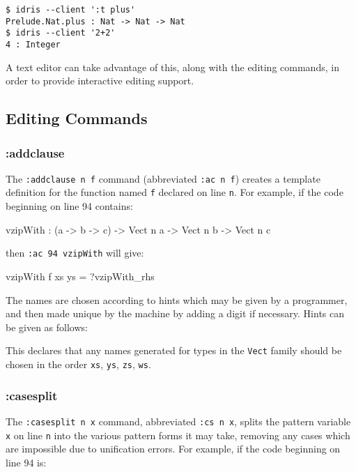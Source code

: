 \begin{lstlisting}[style=stdout]
$ idris --client ':t plus'
Prelude.Nat.plus : Nat -> Nat -> Nat
$ idris --client '2+2'
4 : Integer
\end{lstlisting}

\noindent
A text editor can take advantage of this, along with the editing commands, in order to provide interactive editing support.

\subsection{Editing Commands}

\subsubsection{:addclause}

The \texttt{:addclause n f} command (abbreviated \texttt{:ac n f}) creates a template definition for the function named \texttt{f} declared on line \texttt{n}.
For example, if the code beginning on line 94 contains:

\begin{code}
vzipWith : (a -> b -> c) -> 
           Vect n a -> Vect n b -> Vect n c
\end{code}

\noindent
then \texttt{:ac 94 vzipWith} will give:

\begin{code}
vzipWith f xs ys = ?vzipWith_rhs
\end{code}

\noindent
The names are chosen according to hints which may be given by a programmer, and then made unique by the machine by adding a digit if necessary.
Hints can be given as follows:

\begin{code}
\end{code}

\noindent
This declares that any names generated for types in the \texttt{Vect} family should be chosen in the order \texttt{xs}, \texttt{ys}, \texttt{zs}, \texttt{ws}.

\subsubsection{:casesplit}

The \texttt{:casesplit n x} command, abbreviated \texttt{:cs n x}, splits the pattern variable \texttt{x} on line \texttt{n} into the various pattern forms it may take, removing any cases which are impossible due to unification errors.
For example, if the code beginning on line 94 is:

